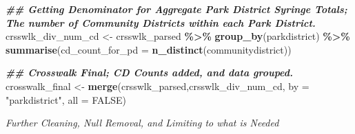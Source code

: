 \documentclass[
]{article}
\newenvironment{Shaded}{\begin{snugshade}}{\end{snugshade}}
\newcommand{\AttributeTok}[1]{\textcolor[rgb]{0.13,0.29,0.53}{#1}}
\newcommand{\ConstantTok}[1]{\textcolor[rgb]{0.56,0.35,0.01}{#1}}
\newcommand{\DocumentationTok}[1]{\textcolor[rgb]{0.56,0.35,0.01}{\textbf{\textit{#1}}}}
\newcommand{\FunctionTok}[1]{\textcolor[rgb]{0.13,0.29,0.53}{\textbf{#1}}}
\newcommand{\NormalTok}[1]{#1}
\newcommand{\OtherTok}[1]{\textcolor[rgb]{0.56,0.35,0.01}{#1}}
\newcommand{\SpecialCharTok}[1]{\textcolor[rgb]{0.81,0.36,0.00}{\textbf{#1}}}
\newcommand{\StringTok}[1]{\textcolor[rgb]{0.31,0.60,0.02}{#1}}
\begin{document}
\begin{Shaded}
\begin{Highlighting}[]
\DocumentationTok{\#\# Getting Denominator for Aggregate Park District Syringe Totals; The number of Community Districts within each Park District. }
\NormalTok{crsswlk\_div\_num\_cd }\OtherTok{\textless{}{-}}\NormalTok{ crsswlk\_parsed }\SpecialCharTok{\%\textgreater{}\%} 
                    \FunctionTok{group\_by}\NormalTok{(parkdistrict) }\SpecialCharTok{\%\textgreater{}\%}
                    \FunctionTok{summarise}\NormalTok{(}\AttributeTok{cd\_count\_for\_pd =} \FunctionTok{n\_distinct}\NormalTok{(communitydistrict))}

\DocumentationTok{\#\# Crosswalk Final; CD Counts added, and data grouped. }
\NormalTok{crosswalk\_final }\OtherTok{\textless{}{-}} \FunctionTok{merge}\NormalTok{(crsswlk\_parsed,crsswlk\_div\_num\_cd, }\AttributeTok{by =} \StringTok{"parkdistrict"}\NormalTok{, }\AttributeTok{all =} \ConstantTok{FALSE}\NormalTok{)}
\end{Highlighting}
\end{Shaded}

\emph{Further Cleaning, Null Removal, and Limiting to what is Needed}
\end{document}
